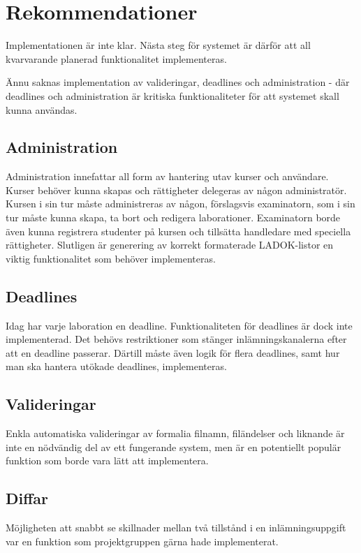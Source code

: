 \section{Rekommendationer}

Implementationen är inte klar. Nästa steg för systemet är därför att all kvarvarande planerad funktionalitet implementeras.

Ännu saknas implementation av valideringar, deadlines och administration - där deadlines och administration är kritiska funktionaliteter för att systemet skall kunna användas. 

\subsection{Administration}
Administration innefattar all form av hantering utav kurser och användare. Kurser behöver kunna skapas och rättigheter delegeras av någon administratör. Kursen i sin tur måste administreras av någon, förslagsvis examinatorn, som i sin tur måste kunna skapa, ta bort och redigera laborationer. Examinatorn borde även kunna registrera studenter på kursen och tillsätta handledare med speciella rättigheter. Slutligen är generering av korrekt formaterade LADOK-listor en viktig funktionalitet som behöver implementeras. 

\subsection{Deadlines}
Idag har varje laboration en deadline. Funktionaliteten för deadlines är dock inte implementerad. Det behövs restriktioner som stänger inlämningskanalerna efter att en deadline passerar. Därtill måste även logik för flera deadlines, samt hur man ska hantera utökade deadlines, implementeras. 

\subsection{Valideringar}
Enkla automatiska valideringar av formalia filnamn, filändelser och liknande är inte en nödvändig del av ett fungerande system, men är en potentiellt populär funktion som borde vara lätt att implementera.

\subsection{Diffar}

Möjligheten att snabbt se skillnader mellan två tillstånd i en inlämningsuppgift var en funktion som projektgruppen gärna hade implementerat.

